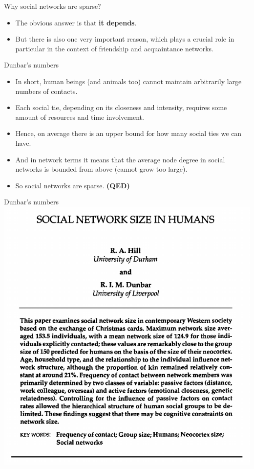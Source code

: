 \documentclass[
    hyperref={colorlinks,linkcolor=blue,urlcolor=blue,citecolor=blue}
]{beamer}
\begin{document}
\begin{frame}{Why social networks are sparse?}
\begin{itemize}
    \item<2-> The obvious answer is that \textbf{it depends}.
    \item<3-> But there is also one very important reason, which plays
    a crucial role in particular in the context of friendship and acquaintance
    networks.
\end{itemize}
\end{frame}

\begin{frame}{Dunbar's numbers}
\begin{itemize}
    \item<2-> In short, human beings (and animals too) cannot maintain
    arbitrarily large numbers of contacts.
    \item<3-> Each social tie, depending on its closeness and intensity,
    requires some amount of resources and time involvement.
    \item<4-> Hence, on average there is an upper bound for how many
    social ties we can have.
    \item<5-> And in network terms it means that the average node degree
    in social networks is bounded from above (cannot grow too large).
    \item<6-> So social networks are sparse. \textbf{(QED)}
\end{itemize}
\end{frame}

\begin{frame}{Dunbar's numbers}
\centering
\includegraphics[width=.7\textwidth]{dunbar-numbers}
\end{frame}
\end{document}
